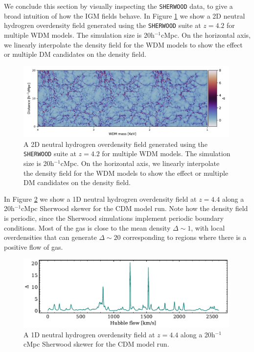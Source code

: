 We conclude this section by visually inspecting the \texttt{SHERWOOD} data, to give a broad intuition of how the IGM fields behave. In Figure \ref{fig: 2D density image} we show a 2D neutral hydrogren overdensity field generated using the \texttt{SHERWOOD} suite at $z=4.2$ for multiple WDM models. The simulation size is 20h$^{-1}$cMpc. On the horizontal axis, we linearly interpolate the density field for the WDM models to show the effect or multiple DM candidates on the density field.
\begin{figure}[h]
        \centering
        \includegraphics[width=0.99\textwidth]{img/ML/density_image_wdm.pdf}
        \caption{A 2D neutral hydrogren overdensity field generated using the \texttt{SHERWOOD} suite at $z=4.2$ for multiple WDM models. The simulation size is 20h$^{-1}$cMpc. On the horizontal axis, we linearly interpolate the density field for the WDM models to show the effect or multiple DM candidates on the density field.}
        \label{fig: 2D density image}     
\end{figure}
In Figure \ref{fig: 1D density skewer} we show a  1D neutral hydrogren overdensity field at $z=4.4$ along a 20h$^{-1}$cMpc Sherwood skewer for the CDM model run. Note how the density field is periodic, since the Sherwood simulations implement periodic boundary conditions. Most of the gas is close to the mean density $\Delta \sim 1$, with local overdensities that can generate $\Delta \sim 20$ corresponding to regions where there is a positive flow of gas.
\begin{figure}
        \centering
        \includegraphics[width=0.99\textwidth]{img/ML/Skewer_density.pdf}
        \caption{A 1D neutral hydrogren overdensity field at $z=4.4$ along a 20h$^{-1}$cMpc Sherwood skewer for the CDM model run.}
        \label{fig: 1D density skewer}     
\end{figure}










